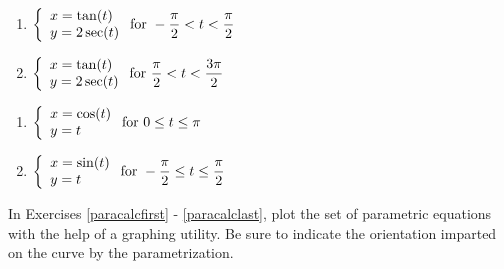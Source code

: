\begin{multicols}{2} \raggedcolumns 
\begin{enumerate}
\setcounter{enumi}{\value{HW}}

\item ${\displaystyle \left\{ \begin{array}{l} x = \tan(t) \\ y = 2\sec(t) \end{array} \right. \vspace{.25in} \mbox{for } -\dfrac{\pi}{2} < t < \dfrac{\pi}{2}}$
\item ${\displaystyle \left\{ \begin{array}{l} x = \tan(t) \\ y = 2\sec(t) \end{array} \right. \vspace{.25in} \mbox{for } \dfrac{\pi}{2} < t < \dfrac{3\pi}{2}}$

\setcounter{HW}{\value{enumi}}
\end{enumerate}
\end{multicols}


\begin{multicols}{2} \raggedcolumns 
\begin{enumerate}
\setcounter{enumi}{\value{HW}}

\item ${\displaystyle \left\{ \begin{array}{l} x = \cos(t) \\ y = t \end{array} \right. \vspace{.25in} \mbox{for } 0 \leq t \leq \pi}$
\item ${\displaystyle \left\{ \begin{array}{l} x = \sin(t) \\ y = t \end{array} \right. \vspace{.25in} \mbox{for } -\dfrac{\pi}{2} \leq t \leq \dfrac{\pi}{2}}$ \label{paraplotlast}

\setcounter{HW}{\value{enumi}}
\end{enumerate}
\end{multicols}

In Exercises \ref{paracalcfirst} - \ref{paracalclast}, plot the set of parametric equations with the help of a graphing utility.  Be sure to indicate the orientation imparted on the curve by the parametrization.  

